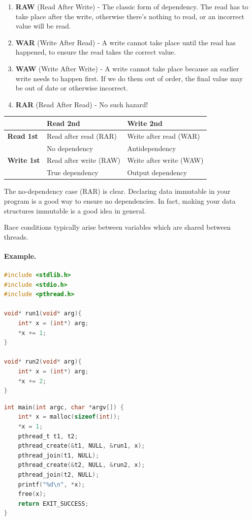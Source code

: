 \documentclass[a4paper]{report}
\begin{document}
\begin{enumerate}
	\item \textbf{RAW} (Read After Write) - The classic form of dependency. The read has to take place after the write, otherwise there's nothing to read, or an incorrect value will be read.
	\item \textbf{WAR} (Write After Read) - A write cannot take place until the read has happened, to ensure the read takes the correct value.
	\item \textbf{WAW} (Write After Write) - A write cannot take place because an earlier write needs to happen first. If we do them out of order, the final value may be out of date or otherwise incorrect.
	\item \textbf{RAR} (Read After Read) - No such hazard! 
\end{enumerate}

\begin{center}
\begin{tabular}{l|ll}
& {\bf Read 2nd} & {\bf Write 2nd} \\ \hline
{\bf Read 1st} & Read after read (RAR) & Write after read (WAR) \\
& No dependency & Antidependency \\
{\bf Write 1st} & Read after write (RAW) & Write after write (WAW) \\
& True dependency & Output dependency
\end{tabular}
\end{center}

The no-dependency case (RAR) is clear. Declaring data immutable 
in your program is a good way to ensure no dependencies. In fact, making your data structures immutable is a good idea in general.


Race conditions typically arise between variables which are shared
between threads.

\paragraph{Example.}
\begin{multicols}{2}
\begin{lstlisting}[language=C]
#include <stdlib.h>
#include <stdio.h>
#include <pthread.h>

void* run1(void* arg){
    int* x = (int*) arg;
    *x += 1;
}

void* run2(void* arg){
    int* x = (int*) arg;
    *x += 2;
}
\end{lstlisting}
\columnbreak
\begin{lstlisting}[language=C]
int main(int argc, char *argv[]) {
    int* x = malloc(sizeof(int));
    *x = 1;
    pthread_t t1, t2;
    pthread_create(&t1, NULL, &run1, x);
    pthread_join(t1, NULL);
    pthread_create(&t2, NULL, &run2, x);
    pthread_join(t2, NULL);
    printf("%d\n", *x);
    free(x);
    return EXIT_SUCCESS;
}
\end{lstlisting}
\end{multicols}
\end{document}
